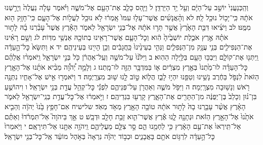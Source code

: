 \documentclass[twoside, openany, parskip=half, 11pt]{book}
\begin{document}
וְהַֽכְּנַעֲנִי֙ יוֹשֵׁ֣ב עַל־הַיָּ֔ם וְעַ֖ל יַ֥ד הַיַּרְדֵּֽן׃ ל וַיַּ֧הַס כָּלֵ֛ב אֶת־הָעָ֖ם אֶל־מֹשֶׁ֑ה וַיֹּ֗אמֶר עָלֹ֤ה נַעֲלֶה֙ וְיָרַ֣שְׁנוּ אֹתָ֔הּ כִּֽי־יָכ֥וֹל נוּכַ֖ל לָֽהּ׃ לא וְהָ֨אֲנָשִׁ֜ים אֲשֶׁר־עָל֤וּ עִמּוֹ֙ אָֽמְר֔וּ לֹ֥א נוּכַ֖ל לַעֲל֣וֹת אֶל־הָעָ֑ם כִּֽי־חָזָ֥ק ה֖וּא מִמֶּֽנּוּ׃ לב וַיֹּצִ֜יאוּ דִּבַּ֤ת הָאָ֙רֶץ֙ אֲשֶׁ֣ר תָּר֣וּ אֹתָ֔הּ אֶל־בְּנֵ֥י יִשְׂרָאֵ֖ל לֵאמֹ֑ר הָאָ֡רֶץ אֲשֶׁר֩ עָבַ֨רְנוּ בָ֜הּ לָת֣וּר אֹתָ֗הּ אֶ֣רֶץ אֹכֶ֤לֶת יוֹשְׁבֶ֙יהָ֙ הִ֔וא וְכׇל־הָעָ֛ם אֲשֶׁר־רָאִ֥ינוּ בְתוֹכָ֖הּ אַנְשֵׁ֥י מִדּֽוֹת׃ לג וְשָׁ֣ם רָאִ֗ינוּ אֶת־הַנְּפִילִ֛ים בְּנֵ֥י עֲנָ֖ק מִן־הַנְּפִלִ֑ים וַנְּהִ֤י בְעֵינֵ֙ינוּ֙ כַּֽחֲגָבִ֔ים וְכֵ֥ן הָיִ֖ינוּ בְּעֵינֵיהֶֽם׃ יד א וַתִּשָּׂא֙ כׇּל־הָ֣עֵדָ֔ה וַֽיִּתְּנ֖וּ אֶת־קוֹלָ֑ם וַיִּבְכּ֥וּ הָעָ֖ם בַּלַּ֥יְלָה הַהֽוּא׃ ב וַיִּלֹּ֙נוּ֙ עַל־מֹשֶׁ֣ה וְעַֽל־אַהֲרֹ֔ן כֹּ֖ל בְּנֵ֣י יִשְׂרָאֵ֑ל וַֽיֹּאמְר֨וּ אֲלֵהֶ֜ם כׇּל־הָעֵדָ֗ה לוּ־מַ֙תְנוּ֙ בְּאֶ֣רֶץ מִצְרַ֔יִם א֛וֹ בַּמִּדְבָּ֥ר הַזֶּ֖ה לוּ־מָֽתְנוּ׃ ג וְלָמָ֣ה יְ֠הֹוָ֠ה מֵבִ֨יא אֹתָ֜נוּ אֶל־הָאָ֤רֶץ הַזֹּאת֙ לִנְפֹּ֣ל בַּחֶ֔רֶב נָשֵׁ֥ינוּ וְטַפֵּ֖נוּ יִהְי֣וּ לָבַ֑ז הֲל֧וֹא ט֦וֹב לָ֖נוּ שׁ֥וּב מִצְרָֽיְמָה׃ ד וַיֹּאמְר֖וּ אִ֣ישׁ אֶל־אָחִ֑יו נִתְּנָ֥ה רֹ֖אשׁ וְנָשׁ֥וּבָה מִצְרָֽיְמָה׃ ה וַיִּפֹּ֥ל מֹשֶׁ֛ה וְאַהֲרֹ֖ן עַל־פְּנֵיהֶ֑ם לִפְנֵ֕י כׇּל־קְהַ֥ל עֲדַ֖ת בְּנֵ֥י יִשְׂרָאֵֽל׃ ו וִיהוֹשֻׁ֣עַ בִּן־נ֗וּן וְכָלֵב֙ בֶּן־יְפֻנֶּ֔ה מִן־הַתָּרִ֖ים אֶת־הָאָ֑רֶץ קָרְע֖וּ בִּגְדֵיהֶֽם׃ ז וַיֹּ֣אמְר֔וּ אֶל־כׇּל־עֲדַ֥ת בְּנֵֽי־יִשְׂרָאֵ֖ל לֵאמֹ֑ר הָאָ֗רֶץ אֲשֶׁ֨ר עָבַ֤רְנוּ בָהּ֙ לָת֣וּר אֹתָ֔הּ טוֹבָ֥ה הָאָ֖רֶץ מְאֹ֥ד מְאֹֽד׃ שלישיח אִם־חָפֵ֥ץ בָּ֙נוּ֙ יְהֹוָ֔ה וְהֵבִ֤יא אֹתָ֙נוּ֙ אֶל־הָאָ֣רֶץ הַזֹּ֔את וּנְתָנָ֖הּ לָ֑נוּ אֶ֕רֶץ אֲשֶׁר־הִ֛וא זָבַ֥ת חָלָ֖ב וּדְבָֽשׁ׃ ט אַ֣ךְ בַּיהֹוָה֮ אַל־תִּמְרֹ֒דוּ֒ וְאַתֶּ֗ם אַל־תִּֽירְאוּ֙ אֶת־עַ֣ם הָאָ֔רֶץ כִּ֥י לַחְמֵ֖נוּ הֵ֑ם סָ֣ר צִלָּ֧ם מֵעֲלֵיהֶ֛ם וַֽיהֹוָ֥ה אִתָּ֖נוּ אַל־תִּירָאֻֽם׃ י וַיֹּֽאמְרוּ֙ כׇּל־הָ֣עֵדָ֔ה לִרְגּ֥וֹם אֹתָ֖ם בָּאֲבָנִ֑ים וּכְב֣וֹד יְהֹוָ֗ה נִרְאָה֙ בְּאֹ֣הֶל מוֹעֵ֔ד אֶֽל־כׇּל־בְּנֵ֖י יִשְׂרָאֵֽל׃
\end{document}
